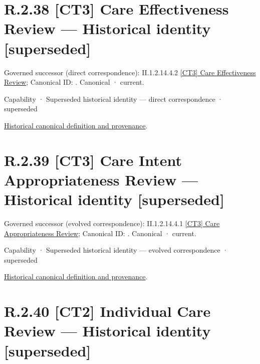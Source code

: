 \section*{R.2.38 [CT3] Care Effectiveness Review — Historical identity [superseded]}
\label{navigation:R.2.38}

{\small Governed successor (direct correspondence): II.1.2.14.4.2 \hyperref[element:79cfeaefeb174a54ba43343d37f035c1]{[CT3] Care Effectiveness Review}; Canonical ID: \texttt{}. Canonical · current.}\par
\label{element:31f49cdea9f44f188459503580c2b86e}
{\small Capability · Superseded historical identity — direct correspondence · superseded}\par
\href{../../../../continuum/strategy/capability/31f49cdea9f44f188459503580c2b86e.md}{Historical canonical definition and provenance}.\par
\section*{R.2.39 [CT3] Care Intent Appropriateness Review — Historical identity [superseded]}
\label{navigation:R.2.39}

{\small Governed successor (evolved correspondence): II.1.2.14.4.1 \hyperref[element:5eac5fb73e31416288d8c992805b33cb]{[CT3] Care Appropriateness Review}; Canonical ID: \texttt{}. Canonical · current.}\par
\label{element:905eb2de1ac341ac96331e3d7f76079b}
{\small Capability · Superseded historical identity — evolved correspondence · superseded}\par
\href{../../../../continuum/strategy/capability/905eb2de1ac341ac96331e3d7f76079b.md}{Historical canonical definition and provenance}.\par
\section*{R.2.40 [CT2] Individual Care Review — Historical identity [superseded]}
\label{navigation:R.2.40}

